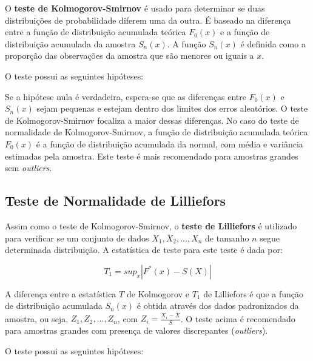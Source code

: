 \documentclass[
  portuguese,
]{estat/estat}
\begin{document}
O \textbf{teste de Kolmogorov-Smirnov} é usado para determinar se duas
distribuições de probabilidade diferem uma da outra. É baseado na
diferença entre a função de distribuição acumulada teórica \(F_0(x)\) e
a função de distribuição acumulada da amostra \(S_n(x)\). A função
\(S_n(x)\) é definida como a proporção das observações da amostra que
são menores ou iguais a \(x\).

O teste possui as seguintes hipóteses:

\begin{center}
\end{center}

Se a hipótese nula é verdadeira, espera-se que as diferenças entre
\(F_0(x)\) e \(S_n(x)\) sejam pequenas e estejam dentro dos limites dos
erros aleatórios. O teste de Kolmogorov-Smirnov focaliza a maior dessas
diferenças. No caso do teste de normalidade de Kolmogorov-Smirnov, a
função de distribuição acumulada teórica \(F_0(x)\) é a função de
distribuição acumulada da normal, com média e variância estimadas pela
amostra. Este teste é mais recomendado para amostras grandes sem
\emph{outliers}.

\subsection{Teste de Normalidade de
Lilliefors}\label{teste-de-normalidade-de-lilliefors}

Assim como o teste de Kolmogorov-Smirnov, o \textbf{teste de Lilliefors}
é utilizado para verificar se um conjunto de dados
\(X_1, X_2, ..., X_n\) de tamanho \(n\) segue determinada distribuição.
A estatística de teste para este teste é dada por:

\[ T_1 = sup_x |F^*(x) - S(X)| \]

A diferença entre a estatística \(T\) de Kolmogorov e \(T_1\) de
Lilliefors é que a função de distribuição acumulada \(S_n(x)\) é obtida
através dos dados padronizados da amostra, ou seja,
\(Z_1, Z_2, ..., Z_n\), com
\(Z_i = \displaystyle \frac{X_i - \bar{X}}{S}\). O teste acima é
recomendado para amostras grandes com presença de valores discrepantes
(\emph{outliers}).

O teste possui as seguintes hipóteses:

\begin{center}
\end{center}
\end{document}
